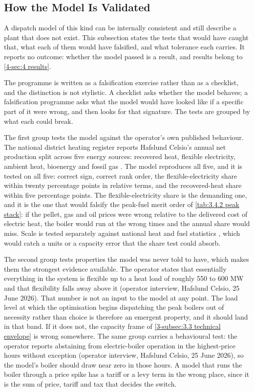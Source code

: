 \subsection{How the Model Is Validated}
\label{3-subsec:3.8 model validation}

A dispatch model of this kind can be internally consistent and still describe a plant that does not exist. This subsection states the tests that would have caught that, what each of them would have falsified, and what tolerance each carries. It reports no outcome: whether the model passed is a result, and results belong to \autoref{4-sec:4 results}.

The programme is written as a falsification exercise rather than as a checklist, and the distinction is not stylistic. A checklist asks whether the model behaves; a falsification programme asks what the model would have looked like if a specific part of it were wrong, and then looks for that signature. The tests are grouped by what each could break.

The first group tests the model against the operator's own published behaviour. The national district heating register reports Hafslund Celsio's annual net production split across five energy sources: recovered heat, flexible electricity, ambient heat, bioenergy and fossil gas \cite{norsk_fjernvarme_fjernkontrollenno_nodate}. The model reproduces all five, and it is tested on all five: correct sign, correct rank order, the flexible-electricity share within twenty percentage points in relative terms, and the recovered-heat share within five percentage points. The flexible-electricity share is the demanding one, and it is the one that would falsify the peak-fuel merit order of \autoref{tab:3.4.2 peak stack}: if the pellet, gas and oil prices were wrong relative to the delivered cost of electric heat, the boiler would run at the wrong times and the annual share would miss. Scale is tested separately against national heat and fuel statistics \cite{statistisk_sentralbyra_statbank_nodate}, which would catch a units or a capacity error that the share test could absorb.

The second group tests properties the model was never told to have, which makes them the strongest evidence available. The operator states that essentially everything in the system is flexible up to a heat load of roughly 550 to 600 MW and that flexibility falls away above it (operator interview, Hafslund Celsio, 25 June 2026). That number is not an input to the model at any point. The load level at which the optimisation begins dispatching the peak boilers out of necessity rather than choice is therefore an emergent property, and it should land in that band. If it does not, the capacity frame of \autoref{3-subsec:3.3 technical envelope} is wrong somewhere. The same group carries a behavioural test: the operator reports abstaining from electric-boiler operation in the highest-price hours without exception (operator interview, Hafslund Celsio, 25 June 2026), so the model's boiler should draw near zero in those hours. A model that runs the boiler through a price spike has a tariff or a levy term in the wrong place, since it is the sum of price, tariff and tax that decides the switch.


